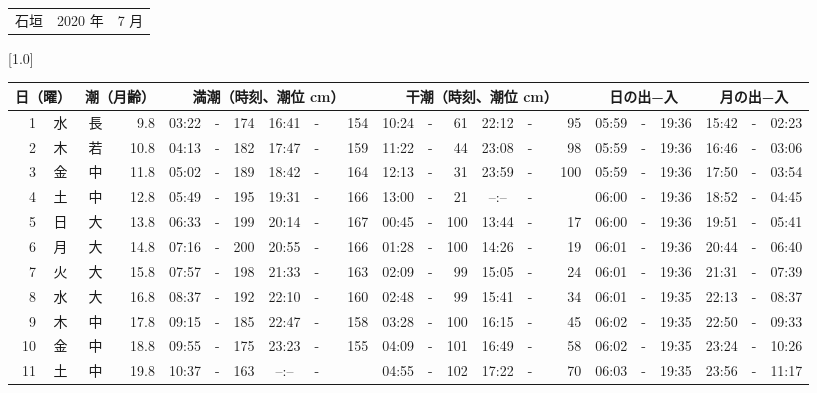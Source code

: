 \documentclass[12pt,a4j]{jsarticle}
\begin{document}
 \begin{table}[htbp]
 \begin{center}
 \begin{tabular}{lcc}
 \LARGE{石垣}  & \large{2020 年} & \large{ 7 月} \\
 \end{tabular}
 \end{center}
 \begin{center}
    \scalebox{0.7}[1.0]{
    \begin{tabular}{|rc|cr|ccrccr|ccrccr|ccc|ccc|}
    \hline
    \multicolumn{2}{|c|}{日（曜）} & \multicolumn{2}{c|}{潮（月齢）} & \multicolumn{6}{c|}{満潮（時刻、潮位 cm）} & \multicolumn{6}{c|}{干潮（時刻、潮位 cm）} & \multicolumn{3}{c|}{日の出−入} &  \multicolumn{3}{c|}{月の出−入}\\
 \hline
 1 & 水 & 長 &  9.8 &  03:22 &-& 174 &  16:41 &-& 154 &  10:24 &-&  61 &  22:12 &-&  95 & 05:59 & -& 19:36 & 15:42 & -& 02:23 \\
 2 & 木 & 若 & 10.8 &  04:13 &-& 182 &  17:47 &-& 159 &  11:22 &-&  44 &  23:08 &-&  98 & 05:59 & -& 19:36 & 16:46 & -& 03:06 \\
 3 & 金 & 中 & 11.8 &  05:02 &-& 189 &  18:42 &-& 164 &  12:13 &-&  31 &  23:59 &-& 100 & 05:59 & -& 19:36 & 17:50 & -& 03:54 \\
 4 & 土 & 中 & 12.8 &  05:49 &-& 195 &  19:31 &-& 166 &  13:00 &-&  21 &  --:-- &-&~~~~~ & 06:00 & -& 19:36 & 18:52 & -& 04:45 \\
 5 & 日 & 大 & 13.8 &  06:33 &-& 199 &  20:14 &-& 167 &  00:45 &-& 100 &  13:44 &-&  17 & 06:00 & -& 19:36 & 19:51 & -& 05:41 \\
 6 & 月 & 大 & 14.8 &  07:16 &-& 200 &  20:55 &-& 166 &  01:28 &-& 100 &  14:26 &-&  19 & 06:01 & -& 19:36 & 20:44 & -& 06:40 \\
 7 & 火 & 大 & 15.8 &  07:57 &-& 198 &  21:33 &-& 163 &  02:09 &-&  99 &  15:05 &-&  24 & 06:01 & -& 19:36 & 21:31 & -& 07:39 \\
 8 & 水 & 大 & 16.8 &  08:37 &-& 192 &  22:10 &-& 160 &  02:48 &-&  99 &  15:41 &-&  34 & 06:01 & -& 19:35 & 22:13 & -& 08:37 \\
 9 & 木 & 中 & 17.8 &  09:15 &-& 185 &  22:47 &-& 158 &  03:28 &-& 100 &  16:15 &-&  45 & 06:02 & -& 19:35 & 22:50 & -& 09:33 \\
10 & 金 & 中 & 18.8 &  09:55 &-& 175 &  23:23 &-& 155 &  04:09 &-& 101 &  16:49 &-&  58 & 06:02 & -& 19:35 & 23:24 & -& 10:26 \\
11 & 土 & 中 & 19.8 &  10:37 &-& 163 &  --:-- &-&~~~~~ &  04:55 &-& 102 &  17:22 &-&  70 & 06:03 & -& 19:35 & 23:56 & -& 11:17 \\

\end{tabular}}
\end{center}
\end{table}
\end{document}
